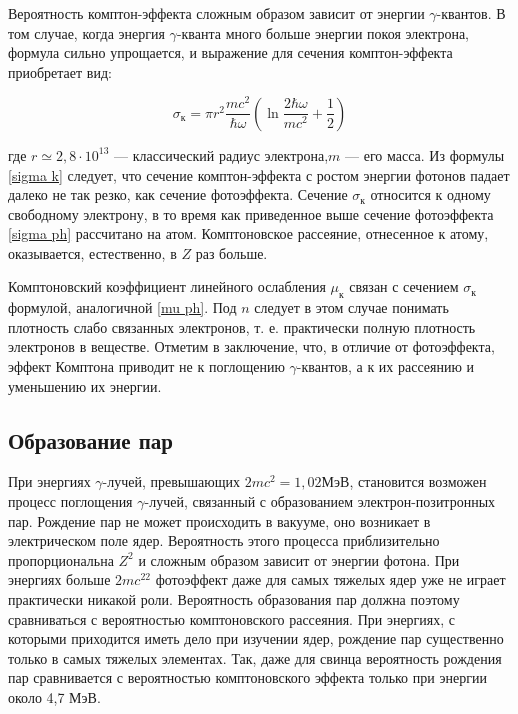 \documentclass[a4paper, 12pt]{article}%
\begin{document}
	Вероятность комптон-эффекта сложным образом зависит от энергии $\gamma$-квантов. В том случае, когда энергия
	$\gamma$-кванта много больше энергии покоя электрона, формула сильно
	упрощается, и выражение для сечения комптон-эффекта приобретает  вид:
	
	\begin{equation}\label{sigma k}
	\sigma_{\text{к}} = \pi r^2 \dfrac{mc^2}{\hbar\omega} \left( \ln{\dfrac{2\hbar\omega}{mc^2} + \dfrac{1}{2}} \right) 
	\end{equation}
	
	где $ r \simeq 2,8 \cdot 10^{13} $ --- классический радиус электрона,$ m $ --- его масса. Из формулы \eqref{sigma k} следует, что сечение комптон-эффекта с ростом энергии фотонов падает далеко не так резко, как сечение фотоэффекта.
	Сечение $ \sigma_{\text{к}} $ относится к одному свободному электрону, в то время как приведенное выше сечение фотоэффекта \eqref{sigma ph} рассчитано на атом.
	Комптоновское рассеяние, отнесенное к атому, оказывается, естественно, в $ Z $ раз больше. 
	
	Комптоновский коэффициент линейного ослабления $ \mu_{\text{к}} $ связан с
	сечением $ \sigma_{\text{к}} $ формулой, аналогичной \eqref{mu ph}. Под $ n $ следует в этом случае понимать плотность слабо связанных электронов, т. е. практически полную плотность электронов в веществе.
	Отметим в заключение, что, в отличие от фотоэффекта, эффект
	Комптона приводит не к поглощению $\gamma$-квантов, а к их рассеянию и
	уменьшению их энергии.
	
	\subsection{Образование пар}
	
	 При энергиях $\gamma$-лучей, превышающих $ 2mc^2 = 1,02  $МэВ, становится возможен процесс поглощения $\gamma$-лучей, связанный с образованием электрон-позитронных пар. Рождение пар не
	может происходить в вакууме, оно возникает в электрическом поле
	ядер. Вероятность этого процесса приблизительно пропорциональна
	$ Z^2  $ и сложным образом зависит от энергии фотона. При энергиях больше $ 2mc^22  $ фотоэффект даже для самых тяжелых ядер уже не играет
	практически никакой роли. Вероятность образования пар должна поэтому сравниваться с вероятностью комптоновского рассеяния. При
	энергиях, с которыми приходится иметь дело при изучении ядер, рождение пар существенно только в самых тяжелых элементах. Так, даже
	для свинца вероятность рождения пар сравнивается с вероятностью
	комптоновского эффекта только при энергии около 4,7 МэВ.
	
\end{document}
